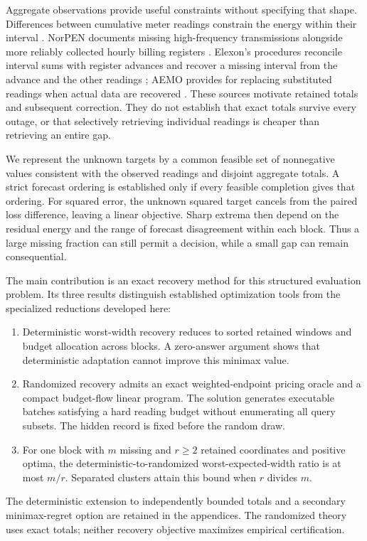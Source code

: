 \documentclass[12pt]{article}
\begin{document}
Aggregate observations provide useful constraints without specifying that
shape. Differences between cumulative meter readings constrain the energy
within their interval \cite{canada}. NorPEN documents missing high-frequency
transmissions alongside more reliably collected hourly billing registers
\cite{norpen}. Elexon's procedures reconcile interval sums with register
advances and recover a missing interval from the advance and the other
readings \cite{elexon}; AEMO provides for replacing substituted readings
when actual data are recovered \cite{aemo}. These sources motivate retained
totals and subsequent correction. They do not establish that exact totals
survive every outage, or that selectively retrieving individual readings
is cheaper than retrieving an entire gap.

We represent the unknown targets by a common feasible set of nonnegative
values consistent with the observed readings and disjoint aggregate totals.
A strict forecast ordering is established only if every feasible completion
gives that ordering. For squared error, the unknown squared target cancels
from the paired loss difference, leaving a linear objective. Sharp extrema
then depend on the residual energy and the range of forecast disagreement
within each block. Thus a large missing fraction can still permit a decision,
while a small gap can remain consequential.

The main contribution is an exact recovery method for this structured
evaluation problem. Its three results distinguish established optimization
tools from the specialized reductions developed here:
\begin{enumerate}
\item Deterministic worst-width recovery reduces to sorted retained windows
and budget allocation across blocks. A zero-answer argument shows that
deterministic adaptation cannot improve this minimax value.
\item Randomized recovery admits an exact weighted-endpoint pricing oracle
and a compact budget-flow linear program. The solution generates executable
batches satisfying a hard reading budget without enumerating all query
subsets. The hidden record is fixed before the random draw.
\item For one block with $m$ missing and $r\geq2$ retained coordinates and positive optima,
the deterministic-to-randomized worst-expected-width ratio is at most $m/r$.
Separated clusters attain this bound when $r$ divides $m$.
\end{enumerate}
The deterministic extension to independently bounded totals and a secondary
minimax-regret option are retained in the appendices. The randomized theory
uses exact totals; neither recovery objective maximizes empirical certification.
\end{document}
